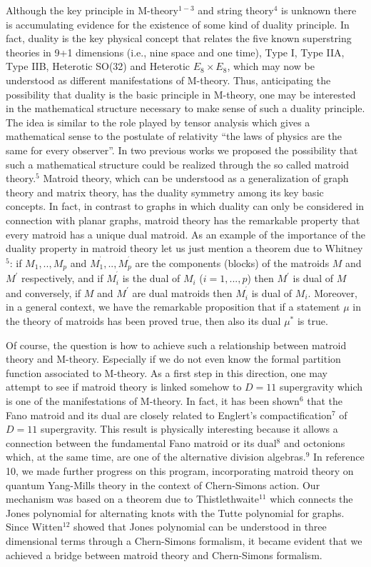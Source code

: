\documentclass[a4paper,12pt]{article}
\begin{document}
Although the key principle in M-theory$^{1-3}$ and string theory$^{4}$ is
unknown there is accumulating evidence for the existence of some kind of
duality principle. In fact, duality is the key physical concept that relates
the five known superstring theories in 9+1 dimensions (i.e., nine space and
one time), Type I, Type IIA, Type IIB, Heterotic SO(32) and Heterotic $%
E_{8}\times E_{8}$, which may now be understood as different manifestations
of M-theory. Thus, anticipating the possibility that duality is the basic
principle in M-theory, one may be interested in the mathematical structure
necessary to make sense of such a duality principle. The idea is similar to
the role played by tensor analysis which gives a mathematical sense to the
postulate of relativity ``the laws of physics are the same for every
observer''. In two previous works we proposed the possibility that such a
mathematical structure could be realized through the so called matroid
theory.$^{5}$ Matroid theory, which can be understood as a generalization of
graph theory and matrix theory, has the duality symmetry among its key basic
concepts. In fact, in contrast to graphs in which duality can only be
considered in connection with planar graphs, matroid theory has the
remarkable property that every matroid has a unique dual matroid. As an
example of the importance of the duality property in matroid theory let us
just mention a theorem due to Whitney$^{5}$: if $M_{1},..,M_{p}$ and $%
M_{1}^{^{\prime }},..,M_{p}^{^{\prime }}$ are the components (blocks) of the
matroids $M$ and $M^{\prime }$ respectively, and if $M_{i}^{^{\prime }}$ is
the dual of $M_{i}$ ($i=1,...,p$) then $M^{\prime }$ is dual of $M$ and
conversely, if $M$ and $M^{\prime }$ are dual matroids then $M_{i}^{^{\prime
}}$ is dual of $M_{i}.$ Moreover, in a general context, we have the
remarkable proposition that if a statement $\mu $ in the theory of matroids
has been proved true, then also its dual $\mu ^{\ast }$ is true.

Of course, the question is how to achieve such a relationship between
matroid theory and M-theory. Especially if we do not even know the formal
partition function associated to M-theory. As a first step in this
direction, one may attempt to see if matroid theory is linked somehow to $%
D=11$ supergravity which is one of the manifestations of M-theory. In fact,
it has been shown$^{6}$ that the Fano matroid and its dual are closely
related to Englert's compactification$^{7}$ of $D=11$ supergravity. This
result is physically interesting because it allows a connection between the
fundamental Fano matroid or its dual$^{8}$ and octonions which, at the same
time, are one of the alternative division algebras.$^{9}$ In reference 10,
we made further progress on this program, incorporating matroid theory on
quantum Yang-Mills theory in the context of Chern-Simons action. Our
mechanism was based on a theorem due to Thistlethwaite$^{11}$ which connects
the Jones polynomial for alternating knots with the Tutte polynomial for
graphs. Since Witten$^{12}$ showed that Jones polynomial can be understood
in three dimensional terms through a Chern-Simons formalism, it became
evident that we achieved a bridge between matroid theory and Chern-Simons
formalism.
\end{document}
